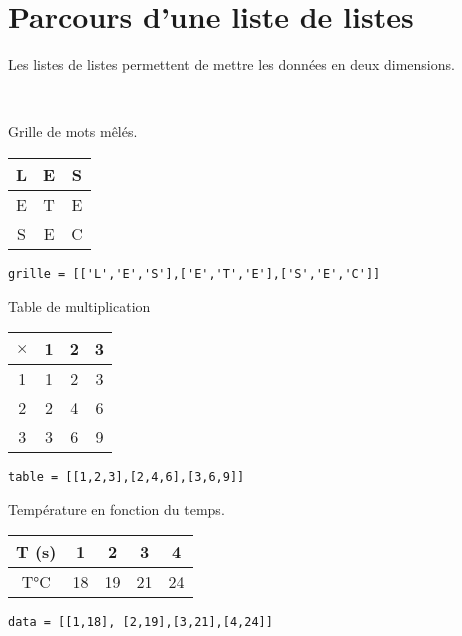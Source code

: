 \section{Parcours d'une liste de listes}
Les listes de listes permettent de mettre les données en deux dimensions. 
\begin{exemple}
~\\
\begin{minipage}[t]{.3\linewidth}
Grille de mots mêlés.
\begin{center}
\begin{tabular}{|c|c|c|}
\hline
L & E & S \\ \hline
E & T & E \\ \hline
S & E & C \\ \hline
\end{tabular}
\end{center}

\begin{lstlisting}
grille = [['L','E','S'],['E','T','E'],['S','E','C']]
\end{lstlisting}
\end{minipage}
\hfill
\begin{minipage}[t]{.3\linewidth}

Table de multiplication
\begin{center}
\begin{tabular}{|c||c|c|c|}
\hline
$\times $ & 1 & 2 & 3 \\
\hline
\hline
1 & 1 & 2 & 3 \\
2 & 2 & 4 &  6 \\
3 & 3 & 6 &  9 \\
\hline
\end{tabular}
\end{center}

\begin{lstlisting}
table = [[1,2,3],[2,4,6],[3,6,9]]
\end{lstlisting}
\end{minipage}
\hfill
\begin{minipage}[t]{.3\linewidth}

Température en fonction du temps.

\begin{center}
\begin{tabular}{|c|c|c|c|c|}
\hline
T (s)& 1 & 2 & 3 & 4 \\
 \hline
 T°C & 18 & 19 & 21 & 24 \\ 
\hline
\end{tabular}
\end{center}

\begin{lstlisting}
data = [[1,18], [2,19],[3,21],[4,24]]
\end{lstlisting}

\end{minipage}
\end{exemple}

